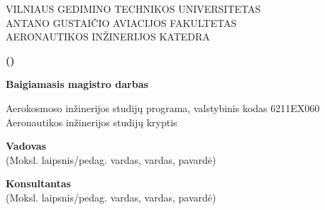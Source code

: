 \begin{titlepage}
    
    \begin{center}

        { VILNIAUS GEDIMINO TECHNIKOS UNIVERSITETAS} \\ 
        \vspace*{5pt}
        { ANTANO GUSTAIČIO AVIACIJOS FAKULTETAS} \\
        { AERONAUTIKOS INŽINERIJOS KATEDRA}


        \vspace*{80pt}

        {\bf {} \studentName}

        \vspace*{50pt}

        {\bf {} \ThesisTitle}

        \vspace*{12pt}

        {\bf {} (\ThesisTitleEng)}

        \vspace*{42pt}

        {\bf {} Baigiamasis magistro darbas}

        \vspace*{42pt}

        {
             Aerokosmoso inžinerijos studijų programa, valstybinis kodas 6211EX060
            Aeronautikos inžinerijos studijų kryptis            
        }

        \vspace*{3em}

    \end{center}

    \begin{flushleft}
        
        
        {\hspace*{1,27cm} \bf Vadovas \hspace{9.7em} \Supervisor \hfil} \\
        {\hspace*{7cm}  (Moksl. laipsnis/pedag. vardas, vardas, pavardė)}
        
        {\hspace*{1,27cm} \bf Konsultantas \hfil \thesisConsultant \hfil} \\
        {\hspace*{7cm}  (Moksl. laipsnis/pedag. vardas, vardas, pavardė)}
        

\end{flushleft}
\end{titlepage}
